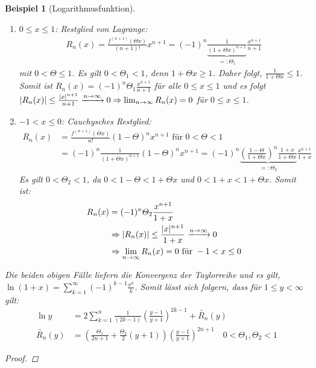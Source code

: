 \documentclass[ngerman,titlepage,twoside, parskip=half*]{scrreprt}
\theoremstyle{break}
\theoremstyle{nonumberbreak}
\newtheorem{beispiel}{Beispiel}
\newtheorem{proof}{Beweis:}
\DeclarePairedDelimiter{\abs}{\lvert}{\rvert}
\begin{document}
\begin{beispiel}[Logarithmusfunktion]
  \begin{enumerate}[1.\,F{a}ll]
  \item $0\leq x\leq 1$: Restglied von Lagrange:
    \begin{gather*}
      R_n(x)=\frac{f^{(n+1)}(\Theta x)}{(n+1)!}x^{n+1}=(-1)^n
      \underbrace{\frac{1}{(1+\Theta x)^{n+1}}}_{=\colon \Theta_1}
      \frac{x^{n+1}}{n+1}
    \end{gather*}
    mit $0<\Theta\leq 1$. Es gilt $0<\Theta_1<1$,
    denn $1+\Theta x\geq 1$. Daher folgt, $\frac{1}{1+\Theta x}\leq 1$.
    Somit ist $R_n(x)=(-1)^n\Theta_1\frac{x^{n+1}}{n+1}$ für alle
    $0\leq x\leq 1$ und es folgt $\abs{R_n(x)}\leq\frac{\abs{x}^{n+1}}{n+1}
    \xrightarrow{n\rightarrow\infty} 0\Rightarrow\lim_{n\rightarrow\infty}
    R_n(x)=0$ für $0\leq x \leq 1$.
  \item $-1<x\leq 0$: Cauchysches Restglied:
    \begin{align*}
      R_n(x)&= \frac{f^{(n+1)}(\Theta x)}{n!}(1-\Theta)^nx^{n+1}\text{ für }
      0<\Theta <1\\
      &= (-1)^n\frac{1}{(1+\Theta x)^{n+1}}(1-\Theta)^nx^{n+1}= (-1)^n\underbrace{\left( \frac{1-\Theta}{1+\Theta x} \right)^n
      \frac{1+x}{1+\Theta x}}_{=\colon\Theta_2}\frac{x^{n+1}}{1+x}
    \end{align*}
    Es gilt $0<\Theta_{2}<1$, da $0<1-\Theta<1+\Theta x$ und $0<1+x<1+\Theta x$.
    Somit ist:
    \begin{align*}
      R_n(x) &= (-1)^n\Theta_2\frac{x^{n+1}}{1+x}\\
      &\Rightarrow
      \abs{R_n(x)}\leq\frac{\abs{x}^{n+1}}{1+x}\xrightarrow{n\rightarrow\infty}
      0\\
      &\Rightarrow \lim_{n\rightarrow\infty} R_n(x)=0\text{ für }
      -1<x\leq 0
    \end{align*}
  \end{enumerate}
  Die beiden obigen Fälle liefern die Konvergenz der Taylorreihe und es gilt, $\ln
  (1+x)= \sum_{k=1}^{\infty} (-1)^{k-1} \frac{x^{k}}{k}$. Somit lässt
  sich folgern, dass für $1\leq y<\infty$ gilt:
  \begin{align*}
    \ln y &= 2\sum_{k=1}^n \frac{1}{(2k-1)}\left(\frac{y-1}{y+1}\right)^{2k-1}
    +\widetilde{R_n}(y)\\
    \widetilde{R_n}(y) &= \left(\frac{\Theta_1}{2n+1}+
      \frac{\Theta_2}{2}(y+1)\right)
    \left(\frac{y-1}{y+1}\right)^{2n+1}\quad 0<\Theta_1,\Theta_2<1
  \end{align*}
  \begin{proof}

\end{proof}
\end{beispiel}
\end{document}
